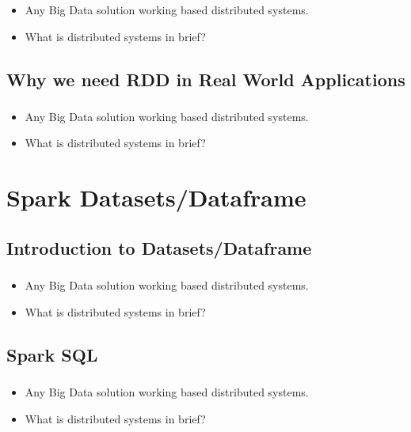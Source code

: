 \begin{frame}
  \frametitle{\subsecname}
	\begin{itemize}[<+->]
		\item Any Big Data solution working based distributed systems.
		\item What is distributed systems in brief?
	\end{itemize}
\end{frame}


\subsection{Why we need RDD in Real World Applications}

\begin{frame}
  \frametitle{\subsecname}
	\begin{itemize}[<+->]
		\item Any Big Data solution working based distributed systems.
		\item What is distributed systems in brief?
	\end{itemize}
\end{frame}


\section{Spark Datasets/Dataframe}

\subsection{Introduction to Datasets/Dataframe}

\begin{frame}
  \frametitle{\subsecname}
	\begin{itemize}[<+->]
		\item Any Big Data solution working based distributed systems.
		\item What is distributed systems in brief?
	\end{itemize}
\end{frame}



\subsection{Spark SQL}
\begin{frame}
  \frametitle{\subsecname}
	\begin{itemize}[<+->]
		\item Any Big Data solution working based distributed systems.
		\item What is distributed systems in brief?
	\end{itemize}
\end{frame}

